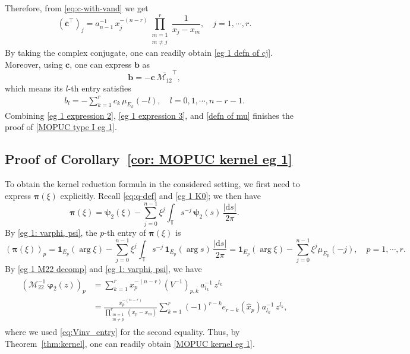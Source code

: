 \documentclass[a4paper,10pt,leqno]{amsart}
\numberwithin{equation}{section}
\theoremstyle{remark}
\newcommand{\dd}{\mathrm{d}}
\newcommand{\TT}{\mathbb{T}}
\begin{document}
Therefore, from \eqref{eq:c-with-vand} we get 
\[
\left( \overline{\bm{c}}^\top \right)_j = a_{n-1}^{-1} \, x_j^{-(n-r)} \prod_{\substack{m=1 \\ m \neq j}}^r \frac{1}{x_j - x_m}, \quad j = 1, \cdots, r.
\]
By taking the complex conjugate, one can readily obtain \eqref{eg 1 defn of cj}.
Moreover, using $\bm{c}$, one can express $\bm{b}$ as
\[
\bm{b} = -\bm{c} \, \overline{\bm{\mathcal{M}}_{12}}^{\top},
\]
which means its $l$-th entry satisfies
\begin{align} \label{eg 1 expression 3}
b_l = -\sum_{k=1}^r c_k \, \mu_{E_k}(-l), \quad l = 0, 1, \cdots, n-r-1.
\end{align}
Combining \eqref{eg 1 expression 2}, \eqref{eg 1 expression 3}, and \eqref{defn of mu} finishes the proof of \eqref{MOPUC type I eg 1}.



\subsection{Proof of Corollary~\ref{cor: MOPUC kernel eg 1}}

To obtain the kernel reduction formula in the considered setting, we first need to express $\bm{\pi}(\xi)$ explicitly. Recall \eqref{eq:q-def} and \eqref{eg 1 K0}; we then have
\[
\bm{\pi}(\xi) = \bm{\psi}_2(\xi) - \sum_{j=0}^{n-1} \xi^j \int_{\TT} s^{-j} \, \bm{\psi}_2(s) \, \frac{|\dd s|}{2\pi}.
\]
By \eqref{eg 1: varphi, psi}, the $p$-th entry of $\bm{\pi}(\xi)$ is
\[
\left(\bm{\pi}(\xi) \right)_p = \mathbf{1}_{E_p}(\arg \xi) - \sum_{j=0}^{n-1} \xi^j \int_{\TT} s^{-j} \, \mathbf{1}_{E_p}(\arg s) \, \frac{|\dd s|}{2\pi} = \mathbf{1}_{E_p}(\arg \xi) - \sum_{j=0}^{n-1} \xi^j \mu_{E_p}(-j), \quad p = 1, \cdots, r.
\]
By \eqref{eg 1 M22 decomp} and \eqref{eg 1: varphi, psi}, we have
\begin{align} \label{eg 1 M22 varphi2}
\begin{aligned}
\left( \bm{\mathcal{M}}_{22}^{-1} \,
\bm{\varphi}_2(z) \right)_p &= \sum_{k=1}^r x_p^{-(n-r)} (V^{-1})_{p,k} \, a_{l_k}^{-1} \, z^{l_k}\\
&= \frac{x_p^{-(n-r)}}{\prod_{\substack{m=1 \\ m \neq p}}^r (x_p - x_m)} \sum_{k=1}^r (-1)^{r-k} e_{r-k}(\hat{x}_p) a_{l_k}^{-1} \, z^{l_k},
\end{aligned}
\end{align}
where we used \eqref{eq:Vinv_entry} for the second equality.
Thus, by Theorem~\ref{thm:kernel}, one can readily obtain \eqref{MOPUC kernel eg 1}.
\end{document}
